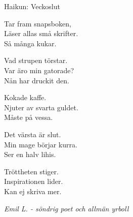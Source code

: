 \documentclass{spektraklet}
\begin{document}
\begin{artikel}{Haikun: Veckoslut}{}
\begin{flushright}
Tar fram snapsboken,\\
Läser allas små skrifter.\\
Så många kukar.
\end{flushright}

\begin{flushleft}
Vad strupen törstar.\\
Var äro min gatorade?\\
Nån har druckit den.
\end{flushleft}

\begin{center}
Kokade kaffe.\\
Njuter av svarta guldet.\\
Måste på vessa.
\end{center}

\begin{flushright}
Det värsta är slut.\\
Min mage börjar kurra.\\
Ser en halv lihis.
\end{flushright}

\begin{flushleft}
Tröttheten stiger.\\
Inspirationen lider.\\
Kan ej skriva mer.
\end{flushleft}

\begin{flushright}
\emph{Emil L. - söndrig poet och allmän yrboll}
\end{flushright}

\vspace{1.6cm}

\end{artikel}


\end{document}
